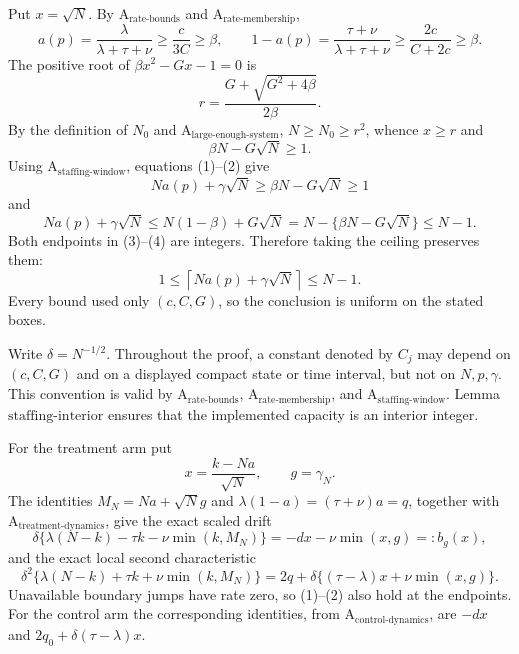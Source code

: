 Put \(x=\sqrt N\).  By \(\mathrm A_{\mathrm{rate\mbox{-}bounds}}\) and \(\mathrm A_{\mathrm{rate\mbox{-}membership}}\),
\[
 a(p)=\frac{\lambda}{\lambda+\tau+\nu}
 \geq \frac{c}{3C}\geq\beta,
 \qquad
 1-a(p)=\frac{\tau+\nu}{\lambda+\tau+\nu}
 \geq\frac{2c}{C+2c}\geq\beta.                       \tag{1}
\]
The positive root of \(\beta x^2-Gx-1=0\) is
\[
 r=\frac{G+\sqrt{G^2+4\beta}}{2\beta}.
\]
By the definition of \(N_0\) and \(\mathrm A_{\mathrm{large\mbox{-}enough\mbox{-}system}}\), \(N\geq N_0\geq r^2\), whence \(x\geq r\) and
\[
 \beta N-G\sqrt N\geq1.                                      \tag{2}
\]
Using \(\mathrm A_{\mathrm{staffing\mbox{-}window}}\), equations (1)--(2) give
\[
 Na(p)+\gamma\sqrt N\geq \beta N-G\sqrt N\geq1              \tag{3}
\]
and
\[
 Na(p)+\gamma\sqrt N
 \leq N(1-\beta)+G\sqrt N
 =N-\{\beta N-G\sqrt N\}\leq N-1.                            \tag{4}
\]
Both endpoints in (3)--(4) are integers.  Therefore taking the ceiling preserves them:
\[
 1\leq \left\lceil Na(p)+\gamma\sqrt N\right\rceil\leq N-1.
\]
Every bound used only \((c,C,G)\), so the conclusion is uniform on the stated boxes.

Write \(\delta=N^{-1/2}\).  Throughout the proof, a constant denoted by \(C_j\) may depend on \((c,C,G)\) and on a displayed compact state or time interval, but not on \(N,p,\gamma\).  This convention is valid by \(\mathrm A_{\mathrm{rate\mbox{-}bounds}}\), \(\mathrm A_{\mathrm{rate\mbox{-}membership}}\), and \(\mathrm A_{\mathrm{staffing\mbox{-}window}}\).  Lemma \(\mathrm{staffing\mbox{-}interior}\) ensures that the implemented capacity is an interior integer.

For the treatment arm put
\[
 x=\frac{k-Na}{\sqrt N},\qquad g=\gamma_N.
\]
The identities \(M_N=Na+\sqrt N g\) and
\(\lambda(1-a)=(\tau+\nu)a=q\), together with \(\mathrm A_{\mathrm{treatment\mbox{-}dynamics}}\), give the exact scaled drift
\[
 \delta\{\lambda(N-k)-\tau k-\nu\min(k,M_N)\}
 =-dx-\nu\min(x,g)=:b_g(x),                                  \tag{1}
\]
and the exact local second characteristic
\[
 \delta^2\{\lambda(N-k)+\tau k+\nu\min(k,M_N)\}
 =2q+\delta\{(\tau-\lambda)x+\nu\min(x,g)\}.                 \tag{2}
\]
Unavailable boundary jumps have rate zero, so (1)--(2) also hold at the endpoints.  For the control arm the corresponding identities, from \(\mathrm A_{\mathrm{control\mbox{-}dynamics}}\), are \(-dx\) and \(2q_0+\delta(\tau-\lambda)x\).

